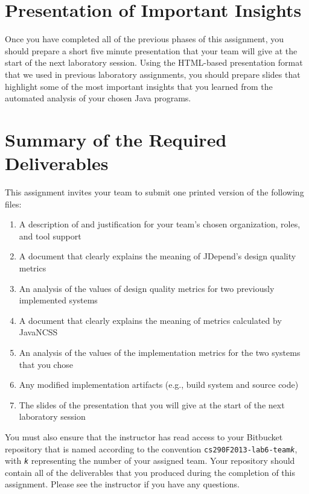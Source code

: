 \section*{Presentation of Important Insights}

Once you have completed all of the previous phases of this assignment, you should prepare a short five minute
presentation that your team will give at the start of the next laboratory session. Using the HTML-based presentation
format that we used in previous laboratory assignments, you should prepare slides that highlight some of the most
important insights that you learned from the automated analysis of your chosen Java programs.

\section*{Summary of the Required Deliverables}

This assignment invites your team to submit one printed version of the following files:
\vspace*{-.1in}
\begin{enumerate}
	\itemsep0em 
	\item A description of and justification for your team's chosen organization, roles, and tool support
	\item A document that clearly explains the meaning of JDepend's design quality metrics 
	\item An analysis of the values of design quality metrics for two previously implemented systems 
	\item A document that clearly explains the meaning of metrics calculated by JavaNCSS
	\item An analysis of the values of the implementation metrics for the two systems that you chose
	\item Any modified implementation artifacts (e.g., build system and source code) 
	\item The slides of the presentation that you will give at the start of the next laboratory session
\end{enumerate}
\vspace*{-.1in}

You must also ensure that the instructor has read access to your Bitbucket repository that is named according to the
convention {\tt cs290F2013-lab6-team{\em k}}, with {\tt {\em k}} representing the number of your assigned team.  Your
repository should contain all of the deliverables that you produced during the completion of this assignment.  Please
see the instructor if you have any questions.


